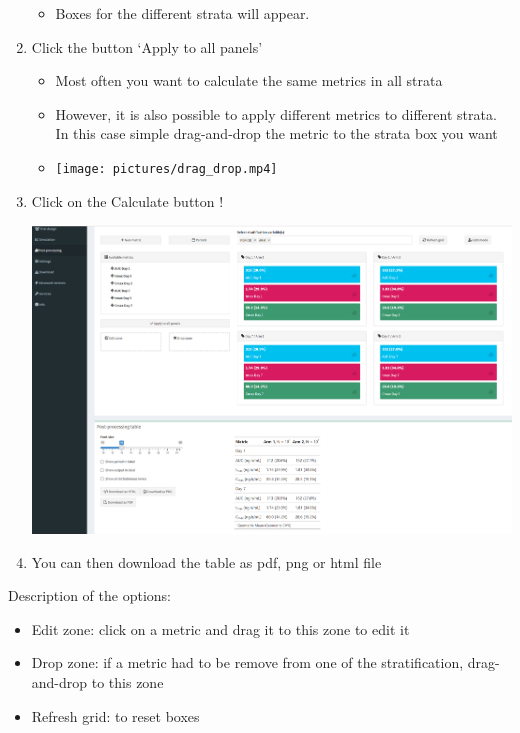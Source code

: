 \documentclass[
]{book}
\providecommand{\tightlist}{%
  \setlength{\itemsep}{0pt}\setlength{\parskip}{0pt}}
\begin{document}
\begin{enumerate}
  \begin{itemize}
  \tightlist
  \item
    Boxes for the different strata will appear.
  \end{itemize}
\item
  Click the button `Apply to all panels'

  \begin{itemize}
  \tightlist
  \item
    Most often you want to calculate the same metrics in all strata
  \item
    However, it is also possible to apply different metrics to different strata. In this case simple drag-and-drop the metric to the strata box you want
  \item
    \texttt{[image: pictures/drag\_drop.mp4]}
  \end{itemize}
\item
  Click on the Calculate button !

  \includegraphics[width=5.14583in,height=\textheight]{pictures/htmltable2.png}
\item
  You can then download the table as pdf, png or html file
\end{enumerate}

Description of the options:

\begin{itemize}
\tightlist
\item
  Edit zone: click on a metric and drag it to this zone to edit it
\item
  Drop zone: if a metric had to be remove from one of the stratification, drag-and-drop to this zone
\item
  Refresh grid: to reset boxes
\end{itemize}
\end{document}
